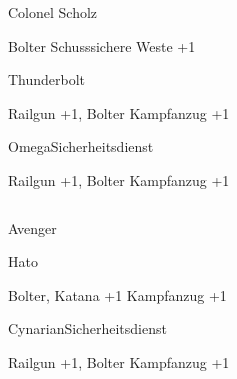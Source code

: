 \begin{column}[l]{0.45}
    \begin{nscsheet}[h]{Colonel Scholz}
        \nscstats[ATT=2,AGG=2,COM=3]
        \nscruler
        \begin{nscinventory}
            \nscitem[Waffen] Bolter
            \nscitem[R"ustung] Schusssichere Weste +1
        \end{nscinventory}
    \end{nscsheet}

    \begin{nscsheet}[h]{Thunderbolt}
        \nscstats[ATT=3,AGG=3,CON=2]
        \nscruler
        \begin{nscinventory}
            \nscitem[Waffen] Railgun +1, Bolter
            \nscitem[R"ustung] Kampfanzug +1
        \end{nscinventory}
    \end{nscsheet}

    \begin{nscsheet}[h]{Omega\newline{}Sicherheitsdienst}
        \nscstats[ATT=3,AGG=3,CON=2]
        \nscruler
        \begin{nscinventory}
            \nscitem[Waffen] Railgun +1, Bolter
            \nscitem[R"ustung] Kampfanzug +1
        \end{nscinventory}
    \end{nscsheet}    
\end{column}
\begin{column}[r]{0.45}
    \begin{nscsheet}[h]{Avenger}
        \nscstats[ATT=2,AGG=2,DEX=2,COM=3,CON=2]
        \nscruler
    \end{nscsheet}
    
    \begin{nscsheet}[h]{Hato}
        \nscstats[ATT=3,AGG=3,CON=2]
        \nscruler
        \begin{nscinventory}
            \nscitem[Waffen] Bolter, Katana +1
            \nscitem[R"ustung] Kampfanzug +1
        \end{nscinventory}
    \end{nscsheet}

    \begin{nscsheet}[h]{Cynarian\newline{}Sicherheitsdienst}
        \nscstats[ATT=2,AGG=2]
        \nscruler
        \begin{nscinventory}
            \nscitem[Waffen] Railgun +1, Bolter
            \nscitem[R"ustung] Kampfanzug +1        
        \end{nscinventory}
    \end{nscsheet}    
\end{column}



